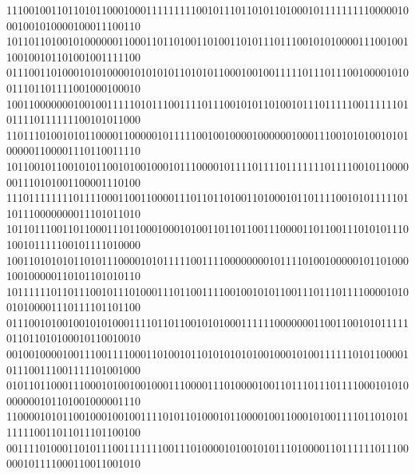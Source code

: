 \documentclass[10pt,\tflang,pdftex]{book}
\begin{document}
{{\begin{minipage}{\oldpwidth}
{{{{111001001101101011000100011111111100101110110101101000101111111110000010001001010000100011100110\blue\\
101101101001010000001100011011010011010011010111011100101010000111001001100100101101001001111100\blue\\
011100110100010101000010101010110101011000100100111110111011100100001010011101101111001000100010\blue\\
100110000000100100111110101110011110111001010110100101110111110011111101011110111111100101011000\blue\\
110111010010101100001100000101111100100100001000000100011100101010010101000001100001110110011110\blue\\
101100101100101011001010010001011100001011110111101111111011110010110000001110101001100001110100\blue\\
111011111111011110001100110000111011011010011010001011011110010101111101101110000000011101011010\blue\\
101101110011011000111011000100010100110110110011100001101100111010101110100101111100101111010000\blue\\
100110101010110101110000101011111001111000000001011110100100000101101000100100000110101101010110\blue\\
101111110110111001011101000111011001111001001010110011101110111100001010010100001110111101101100\blue\\
011100101001001010100011110110110010101000111111000000011001100101011111011011010100010110010010\blue\\
001001000010011100111100011010010110101010101001000101001111110101100001011100111001111101001000\blue\\
010110110001110001010010010001110000111010000100110111011101111000101010000000101101001000001110\blue\\
110000101011001000100100111101011010001011000010011000101001111011010101111110011011011101100100\blue\\
001111010001101011100111111100111010000101001010111010000110111111011100000101111000110011001010\blue\\
}}}}
\end{minipage}}}
\end{document}
